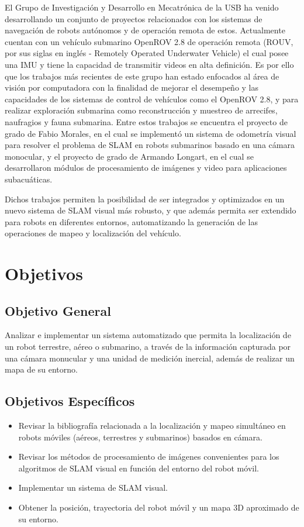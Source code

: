 El Grupo de Investigación y Desarrollo en Mecatrónica de la USB ha venido desarrollando un conjunto de proyectos relacionados con los sistemas de navegación de robots autónomos y de operación remota de estos. Actualmente cuentan con un vehículo submarino OpenROV 2.8 de operación remota (ROUV, por sus siglas en inglés - Remotely Operated Underwater Vehicle) el cual posee una IMU y tiene la capacidad de transmitir videos en alta definición. Es por ello que los trabajos más recientes de este grupo han estado enfocados al área de visión por computadora con la finalidad de mejorar el desempeño y las capacidades de los sistemas de control de vehículos como el OpenROV 2.8, y para realizar exploración submarina como reconstrucción y muestreo de arrecifes, naufragios y fauna submarina. Entre estos trabajos se encuentra el proyecto de grado de Fabio Morales, en el cual se implementó un sistema de odometría visual para resolver el problema de SLAM en robots submarinos basado en una cámara monocular, y el proyecto de grado de  Armando Longart, en el cual se desarrollaron módulos de procesamiento de imágenes y video para aplicaciones subacuáticas.

Dichos trabajos permiten la posibilidad de ser integrados  y optimizados en un nuevo sistema de SLAM visual más robusto, y que además permita ser extendido para robots en diferentes entornos, automatizando la generación de las operaciones de mapeo y localización del vehículo.

\section{Objetivos}

\subsection{Objetivo General}

Analizar e implementar un sistema automatizado que permita la localización de un robot terrestre, aéreo o submarino, a través de la información capturada por una cámara monucular y una unidad de medición inercial, además de realizar un mapa de su entorno.

\subsection{Objetivos Específicos}

\begin{itemize}
	\item  Revisar la  bibliografía relacionada a la localización y mapeo simultáneo en robots móviles (aéreos, terrestres y submarinos) basados en cámara.
	\item Revisar los métodos de procesamiento de imágenes convenientes para los algoritmos de SLAM visual en función del entorno del robot móvil.
	\item Implementar un sistema de SLAM visual.
	\item Obtener la posición, trayectoria del robot móvil y  un mapa 3D aproximado de su entorno.
\end{itemize}


